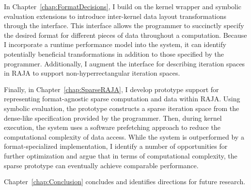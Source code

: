 In Chapter~\ref{chap:FormatDecisions}, I build on the kernel wrapper and symbolic evaluation extensions to introduce inter-kernel data layout transformations through the \FormatDecisions{} interface.
This interface allows the programmer to succinctly specify the desired format for different pieces of data throughout a computation.
Because I incorporate a runtime performance model into the system, it can identify potentially beneficial transformations in addition to those specified by the programmer.
Additionally, I augment the interface for describing iteration spaces in RAJA to support non-hyperrectangular iteration spaces.

Finally, in Chapter~\ref{chap:SparseRAJA}, I develop prototype support for representing format-agnostic sparse computation and data within RAJA.
Using symbolic evaluation, the prototype constructs a sparse iteration space from the dense-like specification provided by the programmer.
Then, during kernel execution, the system uses a software prefetching approach to reduce the computational complexity of data access.
While the system is outperformed by a format-specialized implementation, I identify a number of opportunities for further optimization and argue that in terms of computational complexity, the sparse prototype can eventually achieve comparable performance.

Chapter~\ref{chap:Conclusion} concludes and identifies directions for future research.